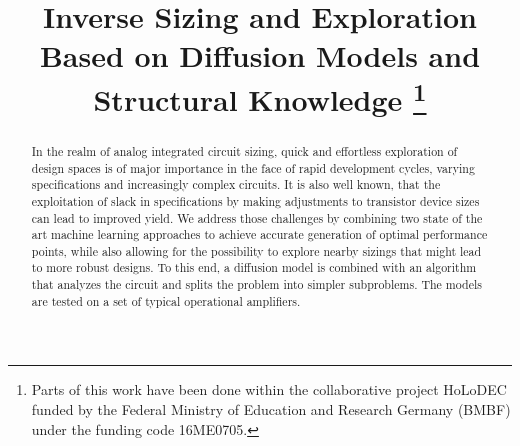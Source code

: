 \documentclass[conference]{IEEEtran}
\begin{document}

\title{Inverse Sizing and Exploration Based on Diffusion Models and Structural Knowledge
\thanks{Parts of this work have been done within the collaborative project HoLoDEC funded by the Federal Ministry of Education and Research Germany (BMBF) under the funding code 16ME0705.}}



\maketitle

\begin{abstract}
In the realm of analog integrated circuit sizing, quick and effortless exploration of design spaces is of major importance in the face of rapid development cycles, varying specifications and increasingly complex circuits.
It is also well known, that the exploitation of slack in specifications by making adjustments to transistor device sizes can lead to improved yield.
We address those challenges by combining two state of the art machine learning approaches to achieve accurate generation of optimal performance points, while also allowing for the possibility to explore nearby sizings that might lead to more robust designs. To this end, a diffusion model is combined with an algorithm that analyzes the circuit and splits the problem into simpler subproblems. The models are tested on a set of typical operational amplifiers.
\end{abstract}

\end{document}
